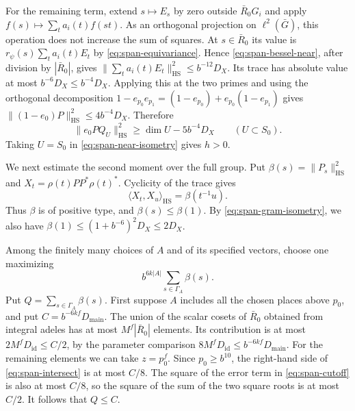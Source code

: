 For the remaining term, extend \(s\mapsto E_s\) by zero outside \(\bar R_0G_i\)
and apply \(f(s)\mapsto\sum_t a_i(t)f(st)\). As an orthogonal projection on
\(\ell^2(\bar G)\), this operation does not increase the sum of squares.
At \(s\in\bar R_0\) its value is \(r_\psi(s)\sum_t a_i(t)E_t\) by
\eqref{eq:span-equivariance}. Hence \eqref{eq:span-bessel-near}, after division by
\(|\bar R_0|\), gives \(\|\sum_t a_i(t)E_t\|_{\mathrm{HS}}^2\le b^{-12}D_X\).
Its trace has absolute value at most \(b^{-6}D_X\le b^{-4}D_X\).
Applying this at the two primes and using the orthogonal decomposition
\(1-e_{p_0}e_{p_1}=(1-e_{p_0})+e_{p_0}(1-e_{p_1})\) gives
\(\|(1-e_0)P\|_{\mathrm{HS}}^2\le4b^{-4}D_X\). Therefore
\begin{equation}\label{eq:span-near-isometry}
 \|e_0P Q_U\|_{\mathrm{HS}}^2\geq \dim U-5b^{-4}D_X
       \qquad(U\subset S_0).
\end{equation}
Taking \(U=S_0\) in \eqref{eq:span-near-isometry} gives \(h>0\).

We next estimate the second moment over the full group. Put
\(\beta(s)=\|P_s\|_{\mathrm{HS}}^2\) and \(X_t=\rho(t)PP^*\rho(t)^*\).
Cyclicity of the trace gives
\[
 \langle X_t,X_u\rangle_{\mathrm{HS}}=\beta(t^{-1}u).
\]
Thus \(\beta\) is of positive type, and \(\beta(s)\leq\beta(1)\).
By \eqref{eq:span-gram-isometry}, we also have
\(\beta(1)\le(1+b^{-6})^2D_X\le2D_X\).

Among the finitely many choices of \(A\) and of its specified vectors,
choose one maximizing
\[
 b^{6k|A|}\sum_{s\in\Gamma_A}\beta(s).
\]
Put \(Q=\sum_{s\in\Gamma_A}\beta(s)\). First suppose \(A\) includes all the
chosen places above \(p_0\), and put \(C=b^{-6kf}D_{\mathrm{main}}\).
The union of the scalar cosets of \(\bar R_0\) obtained from integral adeles
has at most \(M^f|\bar R_0|\) elements. Its contribution is at most
\(2 M^fD_{\mathrm{id}}\le C/2\), by the parameter comparison
\(8 M^f D_{\mathrm{id}}\le b^{-6kf}D_{\mathrm{main}}\).
For the remaining elements we can take \(z=p_0^f\).
Since \(p_0\ge b^{10}\), the right-hand side of \eqref{eq:span-intersect}
is at most \(C/8\). The square of the error term in
\eqref{eq:span-cutoff} is also at most \(C/8\), so the square of the sum
of the two square roots is at most \(C/2\). It follows that \(Q\le C\).

